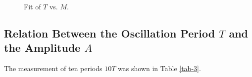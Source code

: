 \documentclass{article}
\begin{document}
\begin{figure}[h!]
	\centering
	\caption{Fit of $T$ vs. $M$.}
	\label{fig-5}
\end{figure}

\newpage

\subsection{Relation Between the Oscillation Period $T$ and the Amplitude $A$}

The measurement of ten periods $10T$ was shown in Table \ref{tab-3}.\\
\end{document}
